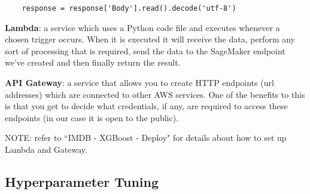 \documentclass[11pt, a4paper]{article}
\begin{document}
\begin{spacing}{1.1}
\begin{lstlisting}
	response = response['Body'].read().decode('utf-8')                                  
	\end{lstlisting} \vspace*{2mm}
	\textbf{Lambda}: a service which uses a Python code file and executes whenever a chosen trigger occurs. When it is executed it will receive the data, perform any sort of processing that is required, send the data to the SageMaker endpoint we've created and then finally return the result. \newpage

	\noindent \textbf{API Gateway}: a service that allows you to create HTTP endpoints (url addresses) which are connected to other AWS services. One of the benefits to this is that you get to decide what credentials, if any, are required to access these endpoints (in our case it is open to the public).
	\begin{center}
		\color{darkgray} NOTE: refer to ``IMDB - XGBoost - Deploy" for details about how to set up Lambda and Gateway. \color{black}
	\end{center} \vspace*{1mm}

	\subsection{Hyperparameter Tuning}
	
	
	
	
	
	
	
	
\end{spacing}
\end{document}
